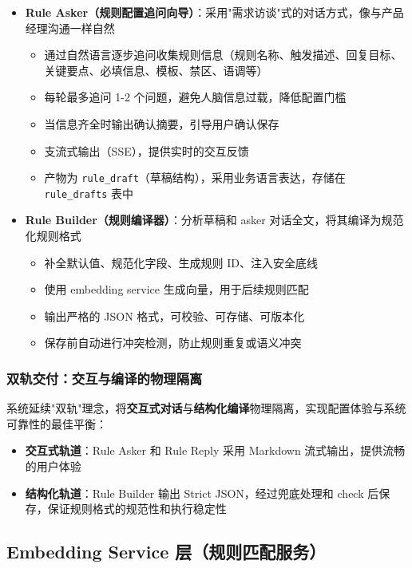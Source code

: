 \documentclass[UTF8]{ctexart}
\begin{document}
\begin{itemize}
    \item \textbf{Rule Asker（规则配置追问向导）}：采用"需求访谈"式的对话方式，像与产品经理沟通一样自然
    \begin{itemize}
        \item 通过自然语言逐步追问收集规则信息（规则名称、触发描述、回复目标、关键要点、必填信息、模板、禁区、语调等）
        \item 每轮最多追问 1-2 个问题，避免人脑信息过载，降低配置门槛
        \item 当信息齐全时输出确认摘要，引导用户确认保存
        \item 支流式输出（SSE），提供实时的交互反馈
        \item 产物为 \texttt{rule\_draft}（草稿结构），采用业务语言表达，存储在 \texttt{rule\_drafts} 表中
    \end{itemize}
    
    \item \textbf{Rule Builder（规则编译器）}：分析草稿和 asker 对话全文，将其编译为规范化规则格式
    \begin{itemize}
        \item 补全默认值、规范化字段、生成规则 ID、注入安全底线
        \item 使用 embedding service 生成向量，用于后续规则匹配
        \item 输出严格的 JSON 格式，可校验、可存储、可版本化
        \item 保存前自动进行冲突检测，防止规则重复或语义冲突
    \end{itemize}
\end{itemize}

\subsubsection{双轨交付：交互与编译的物理隔离}

系统延续"双轨"理念，将\textbf{交互式对话}与\textbf{结构化编译}物理隔离，实现配置体验与系统可靠性的最佳平衡：
\begin{itemize}
    \item \textbf{交互式轨道}：Rule Asker 和 Rule Reply 采用 Markdown 流式输出，提供流畅的用户体验
    \item \textbf{结构化轨道}：Rule Builder 输出 Strict JSON，经过兜底处理和 check 后保存，保证规则格式的规范性和执行稳定性
\end{itemize}

\subsection{Embedding Service 层（规则匹配服务）}
\end{document}
